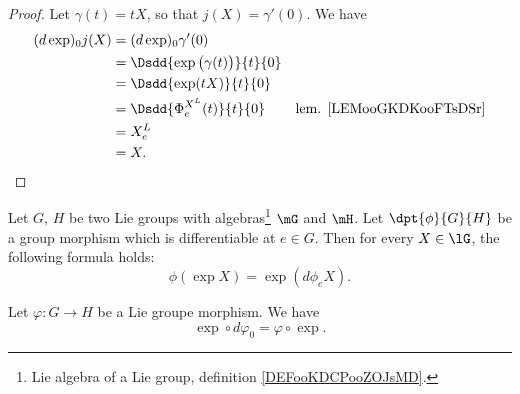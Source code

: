 \begin{proof}
	Let \( \gamma(t)=tX\), so that \( j(X)=\gamma'(0)\). We have
	\begin{subequations}
		\begin{align}
			(d\exp)_0j(X) & =(d\exp)_0\gamma'(0)                                                            \\
			              & =\Dsdd{ \exp\big( \gamma(t) \big) }{t}{0}                                       \\
			              & =\Dsdd{ \exp(tX) }{t}{0}                                                        \\
			              & =\Dsdd{ \Phi_e^{X^L}(t) }{t}{0}           & \text{lem. \ref{LEMooGKDKooFTsDSr}} \\
			              & =X^L_e                                                                          \\
			              & =X.
		\end{align}
	\end{subequations}
\end{proof}

\begin{lemma}		\label{lemsur5d}
	Let $G$, $H$ be two Lie groups with algebras\footnote{Lie algebra of a Lie group, definition \ref{DEFooKDCPooZOJsMD}.} $\mG$ and $\mH$. Let $\dpt{\phi}{G}{H}$ be a group morphism which is differentiable at $e\in G$. Then for every $X\in\lG$, the following formula holds:
	\begin{equation}
		\phi(\exp X)=\exp(d\phi_eX).
	\end{equation}
\end{lemma}

\begin{proposition}       \label{PROPooKYNDooVAEzFw}
	Let \( \varphi\colon G\to H\) be a Lie groupe morphism. We have
	\begin{equation}
		\exp\circ d\varphi_0=\varphi\circ\exp.
	\end{equation}
\end{proposition}

